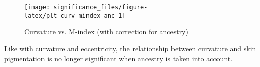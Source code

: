 \documentclass[
]{article}
\begin{document}
\begin{figure}
\texttt{[image: significance\_files/figure-latex/plt\_curv\_mindex\_anc-1]} \caption{Curvature vs. M-index (with correction for ancestry)}\label{fig:plt_curv_mindex_anc}
\end{figure}

Like with curvature and eccentricity, the relationship between curvature
and skin pigmentation is no longer significant when ancestry is taken
into account.
\end{document}
